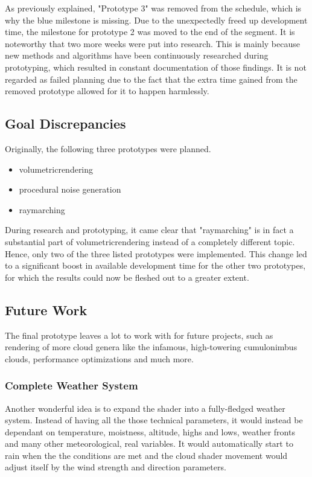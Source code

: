 \vspace{\baselineskip}
\noindent
As previously explained, "Prototype 3" was removed from the schedule, which is why the blue milestone is missing. Due to the unexpectedly freed up development time, the milestone for prototype 2 was moved to the end of the segment.
\emptyline
It is noteworthy that two more weeks were put into research. This is mainly because new methods and algorithms have been continuously researched during prototyping, which resulted in constant documentation of those findings.
It is not regarded as failed planning due to the fact that the extra time gained from the removed prototype allowed for it to happen harmlessly.

\clearpage
\subsection{Goal Discrepancies}
\label{section:projectmanagement:goals}
Originally, the following three prototypes were planned.
\begin{itemize}
    \item \gls{volumetricrendering}
    \item \gls{procedural} \gls{noise} generation
    \item \gls{raymarching}
\end{itemize}
During research and prototyping, it came clear that "\gls{raymarching}" is in fact a substantial part of \gls{volumetricrendering} instead of a completely different topic.
Hence, only two of the three listed prototypes were implemented. This change led to a significant boost in available development time for the other two prototypes, for which the results could now be fleshed out to a greater extent.

\subsection{Future Work}
The final prototype leaves a lot to work with for future projects, such as rendering of more cloud genera like the infamous, high-towering cumulonimbus clouds, performance optimizations and much more.

\subsubsection{Complete Weather System}
Another wonderful idea is to expand the shader into a fully-fledged weather system. Instead of having all the those technical \gls{parameters}, it would instead be dependant on temperature, moistness, altitude, highs and lows, weather fronts and many other meteorological, real variables.
It would automatically start to rain when the the conditions are met and the cloud shader movement would adjust itself by the wind strength and direction \gls{parameters}.